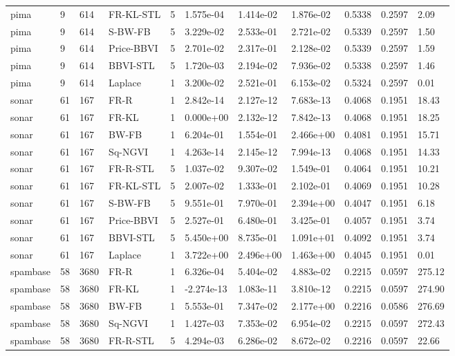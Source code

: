 \begin{tabular}{lllllllllll}
pima & 9 & 614 & FR-KL-STL & 5 & 1.575e-04 & 1.414e-02 & 1.876e-02 & 0.5338 & 0.2597 & 2.09 \\
pima & 9 & 614 & S-BW-FB & 5 & 3.229e-02 & 2.533e-01 & 2.721e-02 & 0.5339 & 0.2597 & 1.50 \\
pima & 9 & 614 & Price-BBVI & 5 & 2.701e-02 & 2.317e-01 & 2.128e-02 & 0.5339 & 0.2597 & 1.59 \\
pima & 9 & 614 & BBVI-STL & 5 & 1.720e-03 & 2.194e-02 & 7.936e-02 & 0.5338 & 0.2597 & 1.46 \\
pima & 9 & 614 & Laplace & 1 & 3.200e-02 & 2.521e-01 & 6.153e-02 & 0.5324 & 0.2597 & 0.01 \\
sonar & 61 & 167 & FR-R & 1 & 2.842e-14 & 2.127e-12 & 7.683e-13 & 0.4068 & 0.1951 & 18.43 \\
sonar & 61 & 167 & FR-KL & 1 & 0.000e+00 & 2.132e-12 & 7.842e-13 & 0.4068 & 0.1951 & 18.25 \\
sonar & 61 & 167 & BW-FB & 1 & 6.204e-01 & 1.554e-01 & 2.466e+00 & 0.4081 & 0.1951 & 15.71 \\
sonar & 61 & 167 & Sq-NGVI & 1 & 4.263e-14 & 2.145e-12 & 7.994e-13 & 0.4068 & 0.1951 & 14.33 \\
sonar & 61 & 167 & FR-R-STL & 5 & 1.037e-02 & 9.307e-02 & 1.549e-01 & 0.4064 & 0.1951 & 10.21 \\
sonar & 61 & 167 & FR-KL-STL & 5 & 2.007e-02 & 1.333e-01 & 2.102e-01 & 0.4069 & 0.1951 & 10.28 \\
sonar & 61 & 167 & S-BW-FB & 5 & 9.551e-01 & 7.970e-01 & 2.394e+00 & 0.4047 & 0.1951 & 6.18 \\
sonar & 61 & 167 & Price-BBVI & 5 & 2.527e-01 & 6.480e-01 & 3.425e-01 & 0.4057 & 0.1951 & 3.74 \\
sonar & 61 & 167 & BBVI-STL & 5 & 5.450e+00 & 8.735e-01 & 1.091e+01 & 0.4092 & 0.1951 & 3.74 \\
sonar & 61 & 167 & Laplace & 1 & 3.722e+00 & 2.496e+00 & 1.463e+00 & 0.4045 & 0.1951 & 0.01 \\
spambase & 58 & 3680 & FR-R & 1 & 6.326e-04 & 5.404e-02 & 4.883e-02 & 0.2215 & 0.0597 & 275.12 \\
spambase & 58 & 3680 & FR-KL & 1 & -2.274e-13 & 1.083e-11 & 3.810e-12 & 0.2215 & 0.0597 & 274.90 \\
spambase & 58 & 3680 & BW-FB & 1 & 5.553e-01 & 7.347e-02 & 2.177e+00 & 0.2216 & 0.0586 & 276.69 \\
spambase & 58 & 3680 & Sq-NGVI & 1 & 1.427e-03 & 7.353e-02 & 6.954e-02 & 0.2215 & 0.0597 & 272.43 \\
spambase & 58 & 3680 & FR-R-STL & 5 & 4.294e-03 & 6.286e-02 & 8.672e-02 & 0.2216 & 0.0597 & 22.66 \\

\end{tabular}
